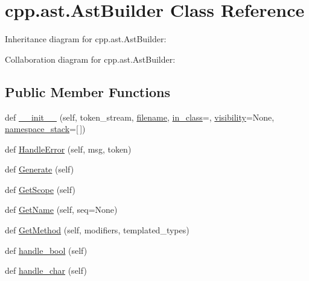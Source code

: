 \hypertarget{classcpp_1_1ast_1_1_ast_builder}{}\section{cpp.\+ast.\+Ast\+Builder Class Reference}
\label{classcpp_1_1ast_1_1_ast_builder}


Inheritance diagram for cpp.\+ast.\+Ast\+Builder\+:


Collaboration diagram for cpp.\+ast.\+Ast\+Builder\+:
\subsection*{Public Member Functions}
\begin{DoxyCompactItemize}
\item 
def \hyperlink{classcpp_1_1ast_1_1_ast_builder_aaf35e2f9d395c99a38e6bb6f9b5dd047}{\+\_\+\+\_\+init\+\_\+\+\_\+} (self, token\+\_\+stream, \hyperlink{classcpp_1_1ast_1_1_ast_builder_ad8b8f5788de55d6c7151e82af8b21115}{filename}, \hyperlink{classcpp_1_1ast_1_1_ast_builder_a9edc1e10a3f005b463fd9316d83dd15d}{in\+\_\+class}=\textquotesingle{}\textquotesingle{}, \hyperlink{classcpp_1_1ast_1_1_ast_builder_a2f16b19846c405101235432d2666b614}{visibility}=None, \hyperlink{classcpp_1_1ast_1_1_ast_builder_ab183aa48e4b6e116379f95eb3d11039c}{namespace\+\_\+stack}=\mbox{[}$\,$\mbox{]})
\item 
def \hyperlink{classcpp_1_1ast_1_1_ast_builder_a3e610662018d674f6c57ef19254cc470}{Handle\+Error} (self, msg, token)
\item 
def \hyperlink{classcpp_1_1ast_1_1_ast_builder_aebd0392eee56def849468af5b93b720a}{Generate} (self)
\item 
def \hyperlink{classcpp_1_1ast_1_1_ast_builder_add6826421ce64546a7dbb9b2e699a4d4}{Get\+Scope} (self)
\item 
def \hyperlink{classcpp_1_1ast_1_1_ast_builder_a327957c4228325fc5f64821b047bdc6f}{Get\+Name} (self, seq=None)
\item 
def \hyperlink{classcpp_1_1ast_1_1_ast_builder_af22fb880867876144d20818391ad267a}{Get\+Method} (self, modifiers, templated\+\_\+types)
\item 
def \hyperlink{classcpp_1_1ast_1_1_ast_builder_ac5a5e19e5be6501d351891cc0ead5f53}{handle\+\_\+bool} (self)
\item 
def \hyperlink{classcpp_1_1ast_1_1_ast_builder_adfbb93646d0d32b39a19f3c70cc031f8}{handle\+\_\+char} (self)
\item 

\end{DoxyCompactItemize}
